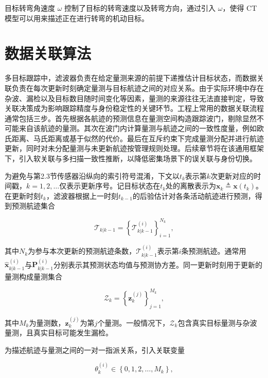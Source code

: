 \documentclass{xdupgthesis}
\begin{document}
目标转弯角速度 $\omega$ 控制了目标的转弯速度以及转弯方向，通过引入 $\omega$，使得 CT 模型可以用来描述正在进行转弯的机动目标。



\section{数据关联算法}\label{sec:orm}
多目标跟踪中，滤波器负责在给定量测来源的前提下递推估计目标状态，而数据关联负责在每次更新时刻确定量测与目标航迹之间的对应关系。由于实际环境中存在杂波、漏检以及目标数目随时间变化等因素，量测的来源往往无法直接判定，导致关联决策成为影响跟踪精度与身份稳定性的关键环节。工程上常用的数据关联流程通常包括三步。首先根据各航迹的预测信息在量测空间构造跟踪波门，剔除显然不可能来自该航迹的量测。其次在波门内计算量测与航迹之间的一致性度量，例如欧氏距离、马氏距离或基于似然的代价。最后在互斥约束下完成量测分配并进行航迹更新，同时对未分配量测与未更新航迹按管理规则处理。后续章节将在该通用框架下，引入软关联与多扫描一致性推断，以降低密集场景下的误关联与身份切换。

为避免与第2.3节传感器沿纵向的索引符号混淆，下文以$t_k$表示第$k$次更新对应的时间戳，$k=1,2,\ldots$仅表示更新序号。记目标状态在$t_k$处的离散表示为$\mathbf{x}_k \triangleq \mathbf{x}(t_k)$。在更新时刻$t_k$，滤波器根据上一时刻$t_{k-1}$的后验估计对各条活动航迹进行预测，得到预测航迹集合

\begin{equation}
	\mathcal{T}_{k|k-1}=\left\{\mathcal{T}^{(i)}_{k|k-1}\right\}_{i=1}^{N_k},
\end{equation}

其中$N_k$为参与本次更新的预测航迹条数，$\mathcal{T}^{(i)}_{k|k-1}$表示第$i$条预测航迹。通常用$\hat{\mathbf{x}}^{(i)}_{k|k-1}$与$\mathbf{P}^{(i)}_{k|k-1}$分别表示其预测状态均值与预测协方差。同一更新时刻用于更新的量测构成量测集合

\begin{equation}
	\mathcal{Z}_k=\left\{\mathbf{z}^{(j)}_k\right\}_{j=1}^{M_k},
\end{equation}

其中$M_k$为量测数，$\mathbf{z}^{(j)}_k$为第$j$个量测。一般情况下，$\mathcal{Z}_k$包含真实目标量测与杂波量测，且真实目标可能发生漏检。

为描述航迹与量测之间的一对一指派关系，引入关联变量

\begin{equation}
	\theta_k^{(i)}\in\left\{0,1,2,\ldots,M_k\right\},
\end{equation}
\end{document}
